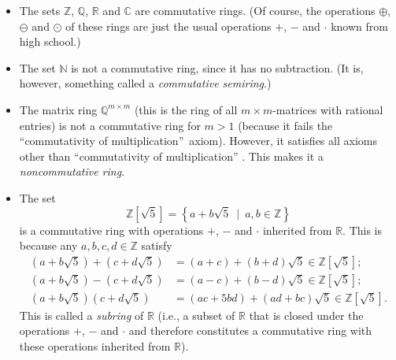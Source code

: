 \begin{itemize}
\item The sets $\mathbb{Z}$, $\mathbb{Q}$, $\mathbb{R}$ and $\mathbb{C}$ are
commutative rings. (Of course, the operations $\oplus$, $\ominus$ and $\odot$
of these rings are just the usual operations $+$, $-$ and $\cdot$ known from
high school.)

\item The set $\mathbb{N}$ is not a commutative ring, since it has no
subtraction. (It is, however, something called a \emph{commutative semiring}.)

\item The matrix ring $\mathbb{Q}^{m\times m}$ (this is the ring of all
$m\times m$-matrices with rational entries) is not a commutative ring for
$m>1$ (because it fails the \textquotedblleft commutativity of
multiplication\textquotedblright\ axiom). However, it satisfies all axioms
other than \textquotedblleft commutativity of multiplication\textquotedblright%
. This makes it a \emph{noncommutative ring}.

\item The set
\[
\mathbb{Z}\left[  \sqrt{5}\right]  =\left\{  a+b\sqrt{5}\ \mid\ a,b\in
\mathbb{Z}\right\}
\]
is a commutative ring with operations $+$, $-$ and $\cdot$ inherited from
$\mathbb{R}$. This is because any $a,b,c,d\in\mathbb{Z}$ satisfy%
\begin{align*}
\left(  a+b\sqrt{5}\right)  +\left(  c+d\sqrt{5}\right)   &  =\left(
a+c\right)  +\left(  b+d\right)  \sqrt{5}\in\mathbb{Z}\left[  \sqrt{5}\right]
;\\
\left(  a+b\sqrt{5}\right)  -\left(  c+d\sqrt{5}\right)   &  =\left(
a-c\right)  +\left(  b-d\right)  \sqrt{5}\in\mathbb{Z}\left[  \sqrt{5}\right]
;\\
\left(  a+b\sqrt{5}\right)  \left(  c+d\sqrt{5}\right)   &  =\left(
ac+5bd\right)  +\left(  ad+bc\right)  \sqrt{5}\in\mathbb{Z}\left[  \sqrt
{5}\right]  .
\end{align*}
This is called a \emph{subring} of $\mathbb{R}$ (i.e., a subset of
$\mathbb{R}$ that is closed under the operations $+$, $-$ and $\cdot$ and
therefore constitutes a commutative ring with these operations inherited from
$\mathbb{R}$).


\end{itemize}
